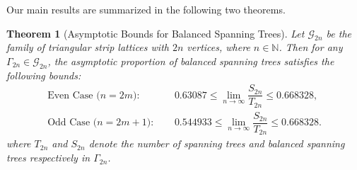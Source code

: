 \documentclass{amsart}
\newtheorem{theorem}{Theorem}[section]
\theoremstyle{definition}
\newcommand{\yandi}[1]{\marginpar{\tiny \color{red} Yandi: #1}}
\newcommand{\saugat}[1]{\marginpar{\tiny \color{blue} Saugat: #1}}
\newcommand{\longnguyen}[1]
{\marginpar{\tiny \color{purple} Long: #1}}
\newcommand{\red}[1]{\textcolor{red}{#1}}
\newcommand{\purple}[1]{\textcolor{purple}{#1}}
\begin{document}



Our main results are summarized in the following two theorems.
\begin{theorem}[Asymptotic Bounds for Balanced Spanning Trees]\label{thm:maintheorem} Let $\mathscr{G}_{2n}$ be the family of triangular strip lattices with $2n$ vertices, where $n \in \mathbb{N}$. Then for any $\Gamma_{2n} \in \mathscr{G}_{2n}$, the asymptotic proportion of balanced spanning trees satisfies the following bounds:
\begin{align*}
\text{Even Case ($n = 2m$): } &\quad 0.63087 \leq \lim_{n \to \infty} \dfrac{S_{2n}}{T_{2n}} \leq 0.668328, \\[0.5em]
\text{Odd Case ($n = 2m + 1$): } &\quad 0.544933 \leq \lim_{n \to \infty} \dfrac{S_{2n}}{T_{2n}} \leq 0.668328.
\end{align*}
where $T_{2n}$ and $S_{2n}$ denote the number of spanning trees and balanced spanning trees respectively in $\Gamma_{2n}$.
\end{theorem} 
\end{document}
